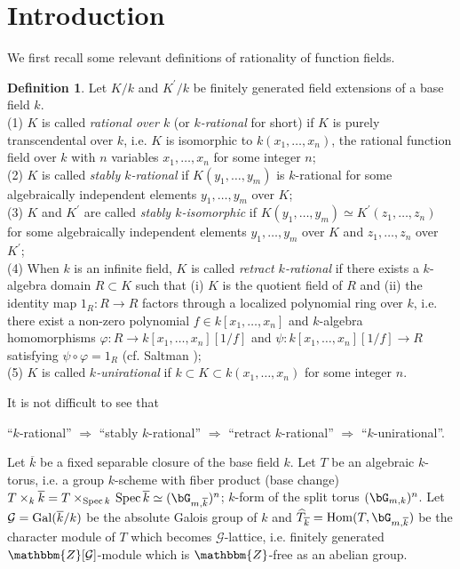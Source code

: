 \documentclass{amsart}
\theoremstyle{plain}
\theoremstyle{definition}
\newtheorem{definition}[theorem]{Definition}
\theoremstyle{remark}
\newcommand{\bZ}{\mathbbm{Z}}\newcommand{\bQ}{\mathbbm{Q}}
\newcounter{sub}\def\tr{\mbox{tr }}
\begin{document}
\tableofcontents


%
\section{Introduction}\label{S1}

We first recall some relevant definitions of rationality of function fields. 
%
\begin{definition}
Let $K/k$ and $K^\prime/k$ be finitely generated field extensions of a base field $k$.\\ 
(1) $K$ is called {\it rational over $k$} 
(or {\it $k$-rational} for short) 
if $K$ is purely transcendental over $k$, 
i.e. $K$ is isomorphic to $k(x_1,\ldots,x_n)$, 
the rational function field over $k$ with $n$ variables $x_1,\ldots,x_n$ 
for some integer $n$;\\
(2) $K$ is called {\it stably $k$-rational} 
if $K(y_1,\ldots,y_m)$ is $k$-rational for some algebraically 
independent elements $y_1,\ldots,y_m$ over $K$;\\
(3) $K$ and $K^\prime$ are called 
{\it stably $k$-isomorphic} 
if $K(y_1,\ldots,y_m)\simeq K^\prime(z_1,\ldots,z_n)$ for some algebraically 
independent elements $y_1,\ldots,y_m$ over $K$ 
and $z_1,\ldots,z_n$ over $K^\prime$;\\
(4) When $k$ is an infinite field, $K$ is called {\it retract $k$-rational} 
if there exists a $k$-algebra domain $R\subset K$ such that 
(i) $K$ is the quotient field of $R$ and (ii) 
the identity map $1_R : R\rightarrow R$ 
factors through a localized polynomial ring over $k$, i.e. 
there exist a non-zero polynomial $f\in k[x_1,\ldots,x_n]$ 
and $k$-algebra homomorphisms 
$\varphi : R\rightarrow k[x_1,\ldots,x_n][1/f]$ and 
$\psi : k[x_1,\ldots,x_n][1/f]\rightarrow R$ satisfying 
$\psi\circ\varphi=1_R$ (cf. Saltman \cite[Definition 3.1]{Sal84});\\
(5) $K$ is called {\it $k$-unirational} 
if $k\subset K\subset k(x_1,\ldots,x_n)$ for some integer $n$. 
\end{definition}
It is not difficult to see that
\begin{center}
``$k$-rational'' $\Rightarrow$ ``stably $k$-rational'' $\Rightarrow$ 
``retract $k$-rational'' $\Rightarrow$ ``$k$-unirational''. 
\end{center}

Let $\overline{k}$ be a fixed separable closure of the base field $k$. 
Let $T$ be an algebraic $k$-torus, 
i.e. a group $k$-scheme with fiber product (base change) 
$T\times_k \overline{k}=
T\times_{{\rm Spec}\, k}\,{\rm Spec}\, \overline{k}
\simeq (\bG_{m,\overline{k}})^n$; 
$k$-form of the split torus $(\bG_{m,k})^n$. 
Let $\mathcal{G}={\rm Gal}(\overline{k}/k)$ be 
the absolute Galois group of $k$ 
and $\widehat{T}_{\overline{k}}={\rm Hom}(T,\bG_{m,\overline{k}})$ 
be the character module of $T$ which becomes 
$\mathcal{G}$-lattice, 
i.e. finitely generated $\bZ[\mathcal{G}]$-module 
which is $\bZ$-free as an abelian group. 
\end{document}
